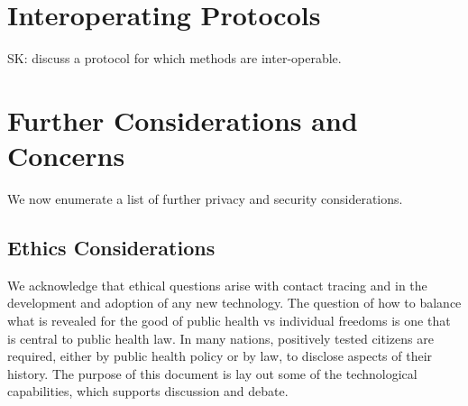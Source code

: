 \documentclass{article}
\newcommand{\sk}[1]{\textsf{\color{magenta} SK: #1}}
\begin{document}
\section{Interoperating Protocols}

\sk{discuss a protocol for which methods are inter-operable.}

\section{Further Considerations and Concerns}
We now enumerate a list of further privacy and security considerations.

\subsection{Ethics Considerations}
We acknowledge that ethical questions arise with contact tracing and in the development and adoption of any new technology. The question of how to balance what is revealed for the good of public health vs individual freedoms is one that is central to public health law. In many nations, positively tested citizens are required, either by public health policy or by law, 
to disclose aspects of their history.  The purpose of this document is lay out some of the technological capabilities, which supports discussion and debate.

\iffalse
\begin{enumerate}
\item All tracing technologies come with risks, benefits, and tradeoffs, including inescapable false positive and false negative rates. The false alerts may not occur evenly but by particular demographic attributes, putting a unfair burdens on specific demographic groups. Accordingly, alerts themselves may also benefit one cross section of society more than another. It is worth noting the current COVID-19 pandemic has placed highly imbalanced risks on essential workers (particularly healthcare workers) compared to non-essential workers in developed nations.
\item The narrowcast broadcasting mechanism permits the local public health departments to provide messages to citizens. The quality of local health departments may vary widely in different regions thereby enabling further imbalances.
\item If adoption occurs, then this creates a different equilibrium in society, where citizens have adopted a new technology which will impact their lives and health. It may not benefit all parties equally.
\item This technology may provide the greatest benefit to those with mobile phones.
\item The protocols outlined here do not explicitly require government regulation or hospital certification. They may also be used with crowd-sourcing or other distributed means. This has implications to lesser developed nations.
\end{enumerate}
\fi
\end{document}
